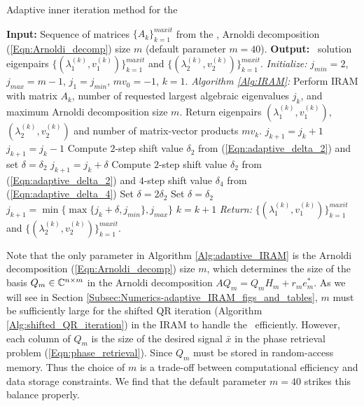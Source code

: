 \begin{enumerate}
\begin{algorithm}[H]
\caption{Adaptive inner iteration method for the \emep}	\label{Alg:adaptive_IRAM}

\begin{algorithmic}[1]
	\Statex 	\textbf{Input:} Sequence of matrices $\{ A_k \}_{k=1}^{maxit}$ from the \emep, Arnoldi decomposition (\ref{Eqn:Arnoldi_decomp})  size $m$ (default parameter $m = 40$).
	\Statex 	\textbf{Output:} \emep \ solution eigenpairs $\{ (\lambda_1^{(k)}, v_1^{(k)}) \}_{k=1}^{maxit}$ and  $\{ (\lambda_2^{(k)}, v_2^{(k)}) \}_{k=1}^{maxit}$.
	\State		\textit{Initialize:} $j_{min}=2$, $j_{max}=m-1$, $j_1=j_{min}$, $mv_0=-1$, $k=1$.
		\State		\textit{Algorithm \ref{Alg:IRAM}:} Perform IRAM with matrix $A_k$, number of requested largest algebraic eigenvalues $j_k$, and maximum Arnoldi decomposition size $m$.  Return eigenpairs $(\lambda_1^{(k)}, v_1^{(k)} )$, $(\lambda_2^{(k)}, v_2^{(k)} )$ and number of matrix-vector products $mv_k$.
			\State 		$j_{k+1} = j_k + 1$
			\State		$j_{k+1} = j_k - 1$
			\State		Compute $2$-step shift value $\delta_2$ from (\ref{Eqn:adaptive_delta_2}) and set $\delta = \delta_2$
			\State		$j_{k+1} = j_k + \delta$
		\Else
			\State 		Compute $2$-step shift value $\delta_2$ from (\ref{Eqn:adaptive_delta_2}) and $4$-step shift value $\delta_4$ from (\ref{Eqn:adaptive_delta_4})
				\State		Set $\delta = 2\delta_2$
			\Else
				\State 			Set $\delta = \delta_2$
			\EndIf
			\State		$j_{k+1} =\min \{ \max \{ j_k + \delta, j_{min} \}, j_{max} \}$
		\EndIf
		\State		$k = k+1$
	\EndWhile
	\State		\textit{Return:} $\{ (\lambda_1^{(k)}, v_1^{(k)}) \}_{k=1}^{maxit}$ and  $\{ (\lambda_2^{(k)}, v_2^{(k)}) \}_{k=1}^{maxit}$.
\end{algorithmic}

\end{algorithm}



Note that the only parameter in Algorithm \ref{Alg:adaptive_IRAM} is the Arnoldi decomposition (\ref{Eqn:Arnoldi_decomp}) size $m$, which determines the size of the basis $Q_m \in {\mathbb C}^{n \times m}$ in the Arnoldi decomposition $AQ_m = Q_mH_m + r_me_m^*$.  As we will see in Section \ref{Subsec:Numerics-adaptive_IRAM_figs_and_tables}, $m$ must be sufficiently large for the shifted QR iteration (Algorithm \ref{Alg:shifted_QR_iteration}) in the IRAM to handle the \emep \ efficiently.  However,  each column of $Q_m$ is the size of the desired signal $\bar{x}$ in the phase retrieval problem (\ref{Eqn:phase_retrieval}).  Since $Q_m$ must be stored in random-access memory.  Thus the choice of $m$ is a trade-off between computational efficiency and data storage constraints.  We find that the default parameter $m=40$ strikes this balance properly.


\end{enumerate}









